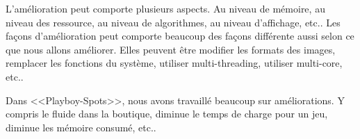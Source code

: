L'amélioration peut comporte plusieurs aspects. Au niveau de mémoire, au niveau des ressource, au niveau de algorithmes, au niveau d'affichage, etc.. Les façons d'amélioration peut comporte beaucoup des façons différente aussi selon ce que nous allons améliorer. Elles peuvent être modifier les formats des images, remplacer les fonctions du système, utiliser multi-threading, utiliser multi-core, etc..

Dans <<Playboy-Spots>>, nous avons travaillé beaucoup sur améliorations. Y compris le fluide dans la boutique, diminue le temps de charge pour un jeu, diminue les mémoire consumé, etc.. 






